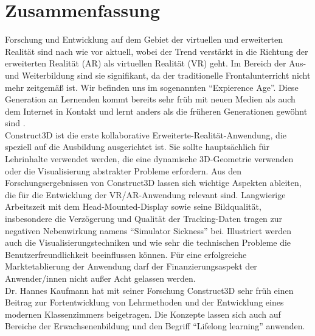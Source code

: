 \documentclass[deutsch]{llncs}
\begin{document}
\section{Zusammenfassung}
Forschung und Entwicklung auf dem Gebiet der virtuellen und erweiterten Realität sind nach wie vor aktuell, wobei der Trend verstärkt in die Richtung der erweiterten Realität (AR) als virtuellen Realität (VR) geht. Im Bereich der Aus- und Weiterbildung sind sie signifikant, da der traditionelle Frontalunterricht nicht mehr zeitgemäß ist. Wir befinden uns im sogenannten ``Expierence Age''. Diese Generation an Lernenden kommt bereits sehr früh mit neuen Medien als auch dem Internet in Kontakt und lernt anders als die früheren Generationen gewöhnt sind \cite{Hu-Au}. \\
Construct3D ist die erste kollaborative Erweiterte-Realität-Anwendung, die speziell auf die Ausbildung ausgerichtet ist. Sie sollte hauptsächlich für Lehrinhalte verwendet werden, die eine dynamische 3D-Geometrie verwenden oder die Visualisierung abstrakter Probleme erfordern. Aus den Forschungsergebnissen von Construct3D lassen sich wichtige Aspekten ableiten, die für die Entwicklung der VR/AR-Anwendung relevant sind. Langwierige Arbeitszeit mit dem Head-Mounted-Display sowie seine Bildqualität, insbesondere die Verzögerung und Qualität der Tracking-Daten tragen zur negativen Nebenwirkung namens ``Simulator Sickness'' bei. Illustriert werden auch die Visualisierungstechniken und wie sehr die technischen Probleme die Benutzerfreundlichkeit beeinflussen können. Für eine erfolgreiche Marktetablierung der Anwendung darf der Finanzierungsaspekt der Anwender/innen nicht außer Acht gelassen werden.\\
Dr. Hannes Kaufmann hat mit seiner Forschung Construct3D sehr früh einen Beitrag zur Fortentwicklung von Lehrmethoden und der Entwicklung eines modernen Klassenzimmers beigetragen. Die Konzepte lassen sich auch auf Bereiche der Erwachsenenbildung und den Begriff ``Lifelong learning'' anwenden. \\

\label{sec:bib}

\printbibliography
\end{document}
